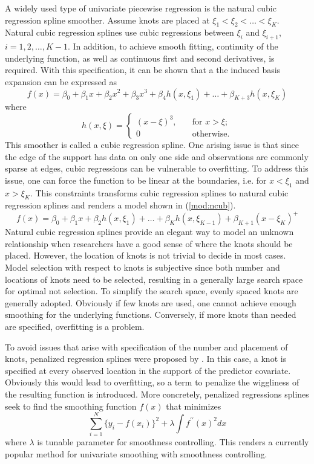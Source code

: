 A widely used type of univariate piecewise regression is the natural cubic regression spline smoother. Assume knots are placed at $\xi_1<\xi_2<\dots<\xi_K$. Natural cubic regression splines use cubic regressions between $\xi_i$ and $\xi_{i+1}$, $i=1,2,\dots,K-1$. In addition, to achieve smooth fitting, continuity of the underlying function, as well as continuous first and second derivatives, is required. With this specification, it can be shown that a the induced basis expansion can be expressed as
\begin{equation} \label{mod:cubic}
f(x)=\beta_0+\beta_1x+\beta_2x^2+\beta_3x^3+\beta_4h(x,\xi_1)+\dots+\beta_{K+3}h(x,\xi_K)
\end{equation} 
where 
\begin{equation} \label{func:cubh}
h(x,\xi)=
\begin{cases}
(x-\xi)^3, &\quad \text{for } x>\xi;\\
0 &\quad \text{otherwise}. 
\end{cases}
\end{equation} 
This smoother is called a cubic regression spline. One arising issue is that since the edge of the support has data on only one side and observations are commonly sparse at edges, cubic regressions can be vulnerable to overfitting. To address this issue, one can force the function to be linear at the boundaries, i.e. for $x<\xi_1$ and $x>\xi_K$. This constraints transforms cubic regression splines to natural cubic regression splines and renders a model shown in (\ref{mod:ncub}).
\begin{equation} \label{mod:ncub}
f(x)=\beta_0+\beta_1x+\beta_2h(x,\xi_1)+\dots+\beta_{K}h(x,\xi_{K-1})+\beta_{K+1}(x-\xi_K)^+
\end{equation} 
Natural cubic regression splines provide an elegant way to model an unknown relationship when researchers have a good sense of where the knots should be placed. However, the location of knots is not trivial to decide in most cases. Model selection with respect to knots is subjective since both number and locations of knots need to be selected, resulting in a generally large search space for optimal not selection. To simplify the search space, evenly spaced knots are generally adopted. Obviously if few knots are used, one cannot achieve enough smoothing for the underlying functions. Conversely, if more knots than needed are specified, overfitting is a problem. 

To avoid issues that arise with specification of the number and placement of knots, penalized regression splines were proposed by \cite{wahba1980spline}. In this case, a knot is specified at every observed location in the support of the predictor covariate. Obviously this would lead to overfitting, so a term to penalize the wiggliness of the resulting function is introduced. More concretely, penalized regressions splines seek to find the smoothing function $f(x)$ that minimizes 
\begin{equation} \label{mod:preg}
\sum_{i=1}^{N}\{y_i-f(x_i)\}^2+\lambda\int f^{\prime \prime} (x)^2dx
\end{equation} 
where $\lambda$ is tunable parameter for smoothness controlling. This renders a currently popular method for univariate smoothing with smoothness controlling. 

